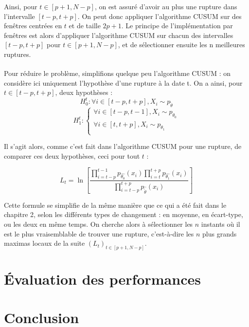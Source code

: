 \documentclass[french,11pt,notitlepage]{report}
\begin{document}
	Ainsi, pour $t \in [p+1, N-p]$, on est assuré d'avoir au plus une rupture dans l'intervalle $[t-p, t+p]$. On peut donc appliquer l'algorithme CUSUM sur des fenêtres centrées en $t$ et de taille $2p+1$. Le principe de l'implémentation par fenêtres est alors d'appliquer l'algorithme CUSUM sur chacun des intervalles $[t-p,t+p]$ pour $t \in [p+1, N-p]$, et de sélectionner ensuite les n meilleures ruptures.
	\\ \\
	Pour réduire le problème, simplifions quelque peu l'algorithme CUSUM : on considère ici uniquement l'hypothèse d'une rupture à la date t. On a ainsi, pour $t \in [t-p,t+p]$, deux hypothèses :
	\begin{equation*}
			H_0^t : \forall i \in [t-p, t+p], X_i \sim p_{\tilde{\theta}}
	\end{equation*}
	\begin{equation*}
			H_1^t : 
			\left\{ \begin{array}{ll}
				\forall i \in [t-p, t-1], X_i \sim p_{\theta_0} \\ \forall i \in [t, t+p], X_i \sim p_{\theta_1} \\
			\end{array} \right.
	\end{equation*}
	
	Il s'agit alors, comme c'est fait dans l'algorithme CUSUM pour une rupture, de comparer ces deux hypothèses, ceci pour tout $t$ :
	
	\begin{equation}
		L_t = \ln \left[ \frac{\prod_{i = t-p}^{t-1} p_{\hat{\theta_0}}(x_i) \prod_{i = t}^{t+p} p_{\hat{\theta_1}}(x_i)}{\prod_{i = t-p}^{t+p} p_{\hat{\tilde{\theta}}}(x_i)} \right]
	\end{equation}
	
	Cette formule se simplifie de la même manière que ce qui a été fait dans le chapitre 2, selon les différents types de changement : en moyenne, en écart-type, ou les deux en même temps. On cherche alors à sélectionner les $n$ instants où il est le plus vraisemblable de trouver une rupture, c'est-à-dire les $n$ plus grands maximas locaux de la suite $(L_t)_{t\in[p+1, N-p]}$.
	
	\chapter{Évaluation des performances}
	
	
	
	
	
	
	\chapter{Conclusion}
	
	
	


	
\end{document}
